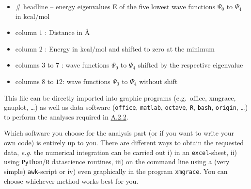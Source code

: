\documentclass[
  letterpaper,
]{article}
\providecommand{\tightlist}{%
  \setlength{\itemsep}{0pt}\setlength{\parskip}{0pt}}\usepackage{longtable,booktabs,array}
\begin{document}
\begin{tcolorbox}[enhanced jigsaw, toptitle=1mm, opacitybacktitle=0.6, colframe=quarto-callout-note-color-frame, toprule=.15mm, breakable, bottomrule=.15mm, left=2mm, title={Note}, titlerule=0mm, leftrule=.75mm, bottomtitle=1mm, coltitle=black, arc=.35mm, rightrule=.15mm, opacityback=0, colback=white, colbacktitle=quarto-callout-note-color!10!white]

\begin{itemize}
\tightlist
\item
  \# headline -- energy eigenvalues E of the five lowest wave functions
  \(\Psi_0\) to \(\Psi_4\) in \(\mathrm{kcal/mol}\)
\item
  column \(1\) : Distance in Å\\
\item
  column \(2\) : Energy in \(\mathrm{kcal/mol}\) and shifted to zero at
  the minimum
\item
  columns \(3\) to \(7\) : wave functions \(\Psi_0\) to \(\Psi_4\)
  shifted by the respective eigenvalue
\item
  columns \(8\) to \(12\): wave functions \(\Psi_0\) to \(\Psi_4\)
  without shift
\end{itemize}

\end{tcolorbox}

This file can be directly imported into graphic programs (e.g.~office,
xmgrace, gnuplot, \ldots) as well as data software (\texttt{office},
\texttt{matlab}, \texttt{octave}, \texttt{R}, \texttt{bash},
\texttt{origin}, \ldots) to perform the analyses required in
\protect\hyperlink{howto}{A.2.2}.

\begin{tcolorbox}[enhanced jigsaw, toptitle=1mm, opacitybacktitle=0.6, colframe=quarto-callout-note-color-frame, toprule=.15mm, breakable, bottomrule=.15mm, left=2mm, title=\textcolor{quarto-callout-note-color}{\faInfo}\hspace{0.5em}{Note}, titlerule=0mm, leftrule=.75mm, bottomtitle=1mm, coltitle=black, arc=.35mm, rightrule=.15mm, opacityback=0, colback=white, colbacktitle=quarto-callout-note-color!10!white]

Which software you choose for the analysis part (or if you want to write
your own code) is entirely up to you. There are different ways to obtain
the requested data, \emph{e.g.} the numerical integration can be carried
out i) in an \texttt{excel}-sheet, ii) using \texttt{Python}/\texttt{R}
datascience routines, iii) on the command line using a (very simple)
\texttt{awk}-script or iv) even graphically in the program
\texttt{xmgrace}. You can choose whichever method works best for you.

\end{tcolorbox}
\end{document}
